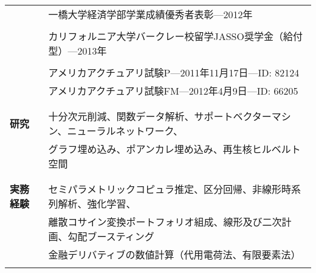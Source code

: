 \documentclass[utf8,letterpaper,oneside]{article}
\begin{document}
\begin{center}
\begin{tabular}{l l}
                      & 一橋大学経済学部学業成績優秀者表彰---2012年                                                    \\
                      &                                                                                                \\
                      & カリフォルニア大学バークレー校留学JASSO奨学金（給付型）---2013年                               \\
                      &                                                                                                \\
                      & アメリカアクチュアリ試験P---2011年11月17日---ID: 82124                                         \\
                      & アメリカアクチュアリ試験FM---2012年4月9日---ID: 66205                                          \\
                      &                                                                                                \\ \hline
                      &                                                                                                \\
  \textbf{研究}       & 十分次元削減、関数データ解析、サポートベクターマシン、ニューラルネットワーク、                 \\
                      & グラフ埋め込み、ポアンカレ埋め込み、再生核ヒルベルト空間                                       \\
                      &                                                                                                \\ \hline
                      &                                                                                                \\
  \textbf{実務経験}   & セミパラメトリックコピュラ推定、区分回帰、非線形時系列解析、強化学習、                         \\
                      & 離散コサイン変換ポートフォリオ組成、線形及び二次計画、勾配ブースティング                       \\
                      & 金融デリバティブの数値計算（代用電荷法、有限要素法）                                           \\
                      &                                                                                                \\ \hline

\end{tabular}
\end{center}
\end{document}
